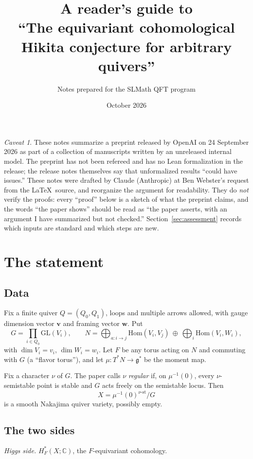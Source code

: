 \documentclass[11pt]{amsart}
\title{A reader's guide to\\ ``The equivariant cohomological Hikita conjecture for arbitrary quivers''}
\author{Notes prepared for the SLMath QFT program}
\date{October 2026}
\theoremstyle{remark}
\newtheorem*{caveat}{Caveat}
\newcommand{\C}{\mathbb{C}}
\newcommand{\GL}{\mathrm{GL}}
\newcommand{\Hom}{\mathrm{Hom}}
\newcommand{\bv}{\mathbf{v}}
\newcommand{\bw}{\mathbf{w}}
\begin{document}
\maketitle

\begin{caveat}
These notes summarize a preprint released by OpenAI on 24 September 2026
\cite{OAI-Hikita} as part of a collection of manuscripts written by an
unreleased internal model.  The preprint has not been refereed and has no
Lean formalization in the release; the release notes themselves say
that unformalized results ``could have issues.''  These notes were drafted
by Claude (Anthropic) at Ben Webster's request from the \LaTeX\ source,
and reorganize the argument for readability.  They do \emph{not} verify
the proofs: every ``proof'' below is a sketch of what the preprint
claims, and the words ``the paper shows'' should be read as ``the paper
asserts, with an argument I have summarized but not checked.''
Section~\ref{sec:assessment} records which inputs are standard and
which steps are new.
\end{caveat}

\section{The statement}

\subsection{Data}
Fix a finite quiver $Q=(Q_0,Q_1)$, loops and multiple arrows allowed, with
gauge dimension vector $\bv$ and framing vector $\bw$.  Put
\[
 G=\prod_{i\in Q_0}\GL(V_i),\qquad
 N=\bigoplus_{a:i\to j}\Hom(V_i,V_j)\ \oplus\ \bigoplus_i\Hom(V_i,W_i),
\]
with $\dim V_i=v_i$, $\dim W_i=w_i$.  Let $F$ be any torus acting on $N$
and commuting with $G$ (a ``flavor torus''), and let $\mu:T^*N\to\mathfrak g^*$
be the moment map.

Fix a character $\nu$ of $G$.  The paper calls $\nu$ \emph{regular} if, on
$\mu^{-1}(0)$, every $\nu$-semistable point is stable and $G$ acts freely
on the semistable locus.  Then
\[
 X=\mu^{-1}(0)^{\nu\text{-st}}/G
\]
is a smooth Nakajima quiver variety, possibly empty.

\subsection{The two sides}
\emph{Higgs side.}  $H^*_F(X;\C)$, the $F$-equivariant cohomology.
\end{document}
